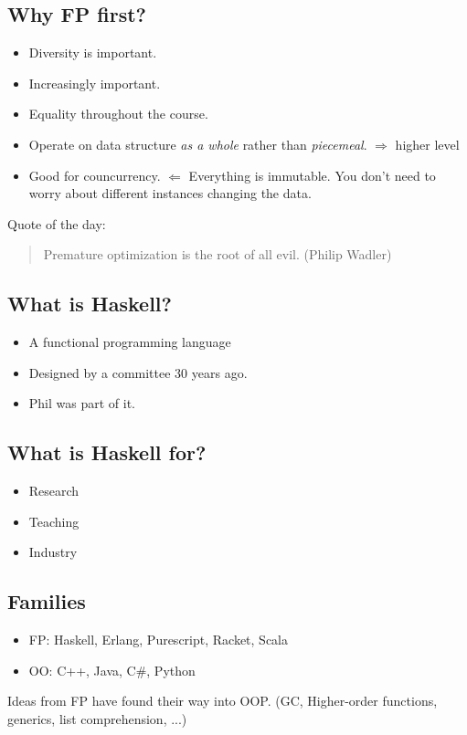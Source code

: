 \documentclass{article}
\begin{document}
\subsection{Why FP first?}
\begin{itemize}
    \item Diversity is important.
    \item Increasingly important.
    \item Equality throughout the course.
    \item Operate on data structure \emph{as a whole} rather than \emph{piecemeal}. $\Rightarrow$ higher level
    \item Good for councurrency.
    $\Leftarrow$ Everything is immutable.
    You don't need to worry about different instances changing the data.
\end{itemize}
Quote of the day:
\begin{quotation}
    Premature optimization is the root of all evil.
    (Philip Wadler)
\end{quotation}
\subsection{What is Haskell?}
\begin{itemize}
    \item A functional programming language
    \item Designed by a committee 30 years ago.
    \item Phil was part of it.
\end{itemize}
\subsection{What is Haskell for?}
\begin{itemize}
    \item Research
    \item Teaching
    \item Industry
\end{itemize}
\subsection{Families}
\begin{itemize}
    \item FP: Haskell, Erlang, Purescript, Racket, Scala
    \item OO: C++, Java, C\#, Python
\end{itemize}
Ideas from FP have found their way into OOP. (GC, Higher-order functions, generics, list comprehension, ...)
\end{document}
